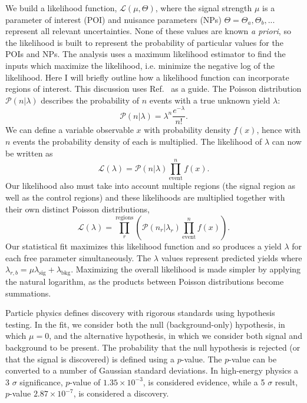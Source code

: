 We build a likelihood function, $\mathcal{L}(\mu,\Theta)$, where the signal strength $\mu$ is a parameter of interest (POI) and nuisance parameters (NPs) $\Theta=\Theta_a,\Theta_b,...$ represent all relevant uncertainties. None of these values are known \textit{a priori}, so the likelihood is built to represent the probability of particular values for the POIs and NPs. The analysis uses a maximum likelihood estimator to find the inputs which maximize the likelihood, i.e. minimize the negative log of the likelihood. Here I will briefly outline how a likelihood function can incorporate regions of interest. This discussion uses Ref.~\cite{cranmer2015practical} as a guide. The Poisson distribution $\mathcal{P}(n|\lambda)$ describes the probability of $n$ events with a true unknown yield $\lambda$:
\begin{equation}
\mathcal{P}(n|\lambda)= \lambda^n\frac{e^{-\lambda}}{n!}.
\end{equation}
We can define a variable observable $x$ with probability density $f(x)$, hence with $n$ events the probability density of each is multiplied. The likelihood of $\lambda$ can now be written as
\begin{equation}
\mathcal{L}(\lambda)=\mathcal{P}(n|\lambda)\prod_{\text{event}}^n f(x).
\end{equation}
Our likelihood also must take into account multiple regions (the signal region as well as the control regions) and these likelihoods are multiplied together with their own distinct Poisson distributions,
\begin{equation}
\mathcal{L}(\lambda)=\prod_r^{\text{regions}}(\mathcal{P}(n_r|\lambda_r)\prod_{\text{event}}^n f(x)).
\end{equation}
Our statistical fit maximizes this likelihood function and so produces a yield $\lambda$ for each free parameter simultaneously. The $\lambda$ values represent predicted yields where $\lambda_{r,b} = \mu \lambda_{\text{sig}}+\lambda_{\text{bkg}}$. Maximizing the overall likelihood is made simpler by applying the natural logarithm, as the products between Poisson distributions become summations.  

Particle physics defines discovery with rigorous standards using hypothesis testing. In the fit, we consider both the null (background-only) hypothesis, in which $\mu=0$, and the alternative hypothesis, in which we consider both signal and background to be present. The probability that the null hypothesis is rejected (or that the signal is discovered) is defined using a $p$-value. The $p$-value can be converted to a number of Gaussian standard deviations. In high-energy physics a 3 $\sigma$ significance, $p$-value of $1.35 \times 10^{-3}$, is considered evidence, while a 5 $\sigma$ result, $p$-value $2.87\times10^{-7}$, is considered a discovery.

